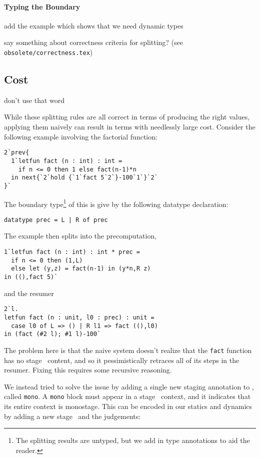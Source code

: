 \paragraph {Typing the Boundary}

\TODO add the example which shows that we need dynamic types



\TODO say something about correctness criteria for splitting? (see
\texttt{obsolete/correctness.tex})

\subsection{Cost}

\TODO don't use that word

While these splitting rules are all correct in terms of producing the right values, applying them naively can result in terms with needlessly large cost.  Consider the following example involving the factorial function:
\begin{lstlisting}
2`prev{
  1`letfun fact (n : int) : int = 
    if n <= 0 then 1 else fact(n-1)*n
  in next{`2`hold {`1`fact 5`2`}-100`1`}`2`
}`
\end{lstlisting}

The boundary type\footnote{The splitting results are untyped, but we add in type annotations to aid the reader.} of this is give by the following datatype declaration:
\begin{lstlisting}
datatype prec = L | R of prec
\end{lstlisting}
The example then splits into the precomputation,
\begin{lstlisting}
1`letfun fact (n : int) : int * prec = 
  if n <= 0 then (1,L) 
  else let (y,z) = fact(n-1) in (y*n,R z)
in ((),fact 5)`
\end{lstlisting}
and the resumer
\begin{lstlisting}
2`l.
letfun fact (n : unit, l0 : prec) : unit = 
  case l0 of L => () | R l1 => fact ((),l0)
in (fact (#2 l); #1 l)-100`
\end{lstlisting}
The problem here is that the naive system doesn't realize that the \texttt{fact} function has no stage \bbtwo\ content,
and so it pessimistically retraces all of its steps in the resumer.  
Fixing this requires some recursive reasoning.  

We instead tried to solve the issue by adding a single new staging annotation to \lang, called \texttt{mono}.  
A \texttt{mono} block must appear in a stage \bbone\ context, and it indicates that its entire context is monostage.
This can be encoded in our statics and dynamics by adding a new stage \bbmono\ and the judgements:

